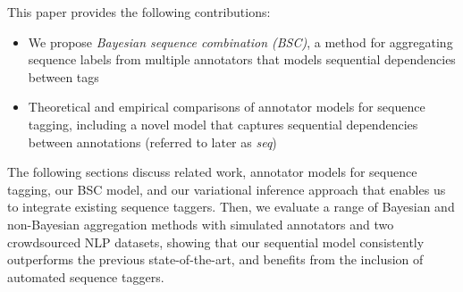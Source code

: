 %

This paper provides the following contributions:
\begin{itemize}
 \item We propose \emph{Bayesian sequence combination (BSC)}, 
 a method for aggregating sequence labels from multiple annotators 
 that models sequential dependencies between tags 
 \item Theoretical and empirical comparisons of annotator models 
  for sequence tagging, including a novel model that captures sequential dependencies between annotations (referred to later as \emph{seq})
\end{itemize}


The following sections discuss related work, 
annotator models for sequence tagging,
our BSC model, and our variational inference approach
 that enables us to integrate existing sequence taggers. 
Then, we evaluate a range of Bayesian and non-Bayesian aggregation methods
with simulated annotators and two crowdsourced NLP datasets,
showing that our sequential model consistently outperforms the previous state-of-the-art,
and benefits from the inclusion of automated sequence taggers.

